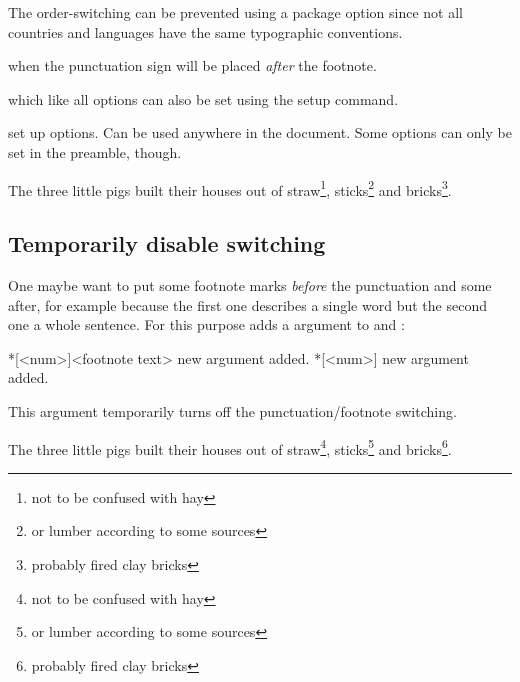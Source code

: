 \documentclass[toc=index,toc=bib]{cnpkgdoc}
\begin{document}
The order-switching can be prevented using a package option since not all countries
and languages have the same typographic conventions.
\begin{beschreibung}
  when  the punctuation sign
 will be placed \emph{after} the footnote.
\end{beschreibung}
which like all options can also be set using the setup command.
\begin{beschreibung}
  set up options. Can be used anywhere in the document.
 Some options can only be set in the preamble, though.
\end{beschreibung}
\begin{beispiel}
 \begin{minipage}{.4\linewidth}
  \noindent The three little pigs built their houses
  out of straw\footnote{not to be confused with hay},
  sticks\footnote{or lumber according to some sources}
  and bricks\footnote{probably fired clay bricks}.
 \end{minipage}
\end{beispiel}

\subsection{Temporarily disable switching}
One maybe want to put some footnote marks \emph{before} the punctuation and some
after, for example because the first one describes a single word but the second
one a whole sentence. For this purpose \fnpct adds a \code{*} argument to 
and :
\begin{beschreibung}
 *[<num>]{<footnote text>} new \code{*} argument added.
 *[<num>] new \code{*} argument added.
\end{beschreibung}
This argument temporarily turns off the punctuation/footnote switching.
\begin{beispiel}
 \begin{minipage}{.4\linewidth}
  \noindent The three little pigs built their houses
  out of straw\footnote*{not to be confused with hay},
  sticks\footnote{or lumber according to some sources}
  and bricks\footnote{probably fired clay bricks}.
 \end{minipage}
\end{beispiel}

\end{document}
